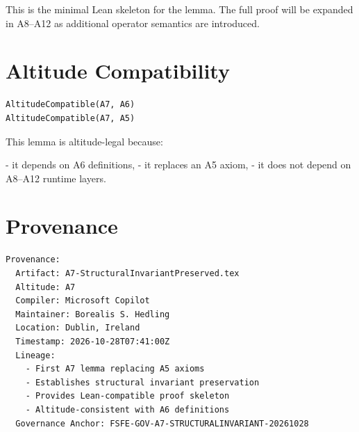 \documentclass[11pt]{article}
\begin{document}
This is the minimal Lean skeleton for the lemma. The full proof will be expanded
in A8–A12 as additional operator semantics are introduced.

\newpage


\section{Altitude Compatibility}

\begin{verbatim}
AltitudeCompatible(A7, A6)
AltitudeCompatible(A7, A5)
\end{verbatim}

This lemma is altitude-legal because:

- it depends on A6 definitions,
- it replaces an A5 axiom,
- it does not depend on A8–A12 runtime layers.

\newpage


\section*{Provenance}

\begin{verbatim}
Provenance:
  Artifact: A7-StructuralInvariantPreserved.tex
  Altitude: A7
  Compiler: Microsoft Copilot
  Maintainer: Borealis S. Hedling
  Location: Dublin, Ireland
  Timestamp: 2026-10-28T07:41:00Z
  Lineage:
    - First A7 lemma replacing A5 axioms
    - Establishes structural invariant preservation
    - Provides Lean-compatible proof skeleton
    - Altitude-consistent with A6 definitions
  Governance Anchor: FSFE-GOV-A7-STRUCTURALINVARIANT-20261028
\end{verbatim}
\end{document}
